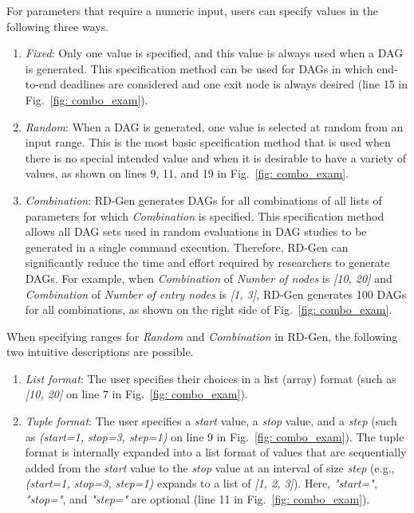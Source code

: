 For parameters that require a numeric input, users can specify values in the following three ways.
\begin{enumerate}
    \item {\it Fixed}: Only one value is specified, and this value is always used when a DAG is generated. This specification method can be used for DAGs in which end-to-end deadlines are considered and one exit node is always desired (line 15 in Fig.~\ref{fig: combo_exam}).
    \item {\it Random}: When a DAG is generated, one value is selected at random from an input range. This is the most basic specification method that is used when there is no special intended value and when it is desirable to have a variety of values, as shown on lines 9, 11, and 19 in Fig.~\ref{fig: combo_exam}.
    \item {\it Combination}: RD-Gen generates DAGs for all combinations of all lists of parameters for which {\it Combination} is specified. This specification method allows all DAG sets used in random evaluations in DAG studies to be generated in a single command execution. Therefore, RD-Gen can significantly reduce the time and effort required by researchers to generate DAGs. For example, when {\it Combination} of {\it Number of nodes} is {\it [10, 20]} and {\it Combination} of {\it Number of entry nodes} is {\it [1, 3],} RD-Gen generates 100 DAGs for all combinations, as shown on the right side of Fig.~\ref{fig: combo_exam}.
\end{enumerate}

When specifying ranges for {\it Random} and {\it Combination} in RD-Gen, the following two intuitive descriptions are possible.
\begin{enumerate}
    \item {\it List format}: The user specifies their choices in a list (array) format (such as {\it [10, 20]} on line 7 in Fig.~\ref{fig: combo_exam}).
    \item {\it Tuple format}: The user specifies a {\it start} value, a {\it stop} value, and a {\it step} (such as {\it (start=1, stop=3, step=1)} on line 9 in Fig.~\ref{fig: combo_exam}). The tuple format is internally expanded into a list format of values that are sequentially added from the {\it start} value to the {\it stop} value at an interval of size {\it step} (e.g., {\it (start=1, stop=3, step=1)} expands to a list of {\it [1, 2, 3]}). Here, {\it "start="}, {\it "stop="}, and {\it "step="} are optional (line 11 in Fig.~\ref{fig: combo_exam}).
\end{enumerate}

